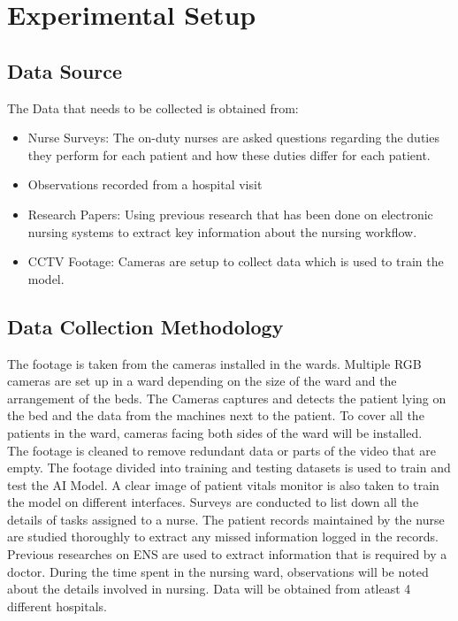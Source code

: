 \section{Experimental Setup}
\subsection{Data Source}
The Data that needs to be collected is obtained from:
\begin{itemize}
    \item Nurse Surveys: The on-duty nurses are asked questions regarding the duties they perform for each patient and how these duties differ for each patient.
    \item Observations recorded from a hospital visit
    \item Research Papers: Using previous research that has been done on electronic nursing systems to extract key information about the nursing workflow.
    \item CCTV Footage: Cameras are setup to collect data which is used to train the model.
\end{itemize}
\subsection{Data Collection Methodology}
The footage is taken from the cameras installed in the wards. Multiple RGB cameras are set up in a ward depending on the size of the ward and the arrangement of the beds. The Cameras captures and detects the patient lying on the bed and the data from the machines next to the patient. To cover all the patients in the ward, cameras facing both sides of the ward will be installed.\\
The footage is cleaned to remove redundant data or parts of the video that are empty. The footage divided into training and testing datasets is used to train and test the AI Model. A clear image of patient vitals monitor is also taken to train the model on different interfaces. 
Surveys are conducted to list down all the details of tasks assigned to a nurse. The patient records maintained by the nurse are studied thoroughly to extract any missed information logged in the records. Previous researches on ENS are used to extract information that is required by a doctor. During the time spent in the nursing ward, observations will be noted about the details involved in nursing. 
Data will be obtained from atleast 4 different hospitals.


